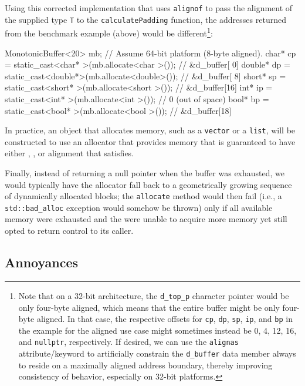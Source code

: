 \noindent Using this corrected implementation that uses \lstinline!alignof! to pass
the alignment of the supplied type \lstinline!T! to the
\lstinline!calculatePadding! function, the addresses returned from the
benchmark example (above) would be different{\cprotect\footnote{Note
that on a 32-bit architecture, the \lstinline!d_top_p! character
pointer would be only four-byte aligned, which means that the entire
buffer might be only four-byte aligned. In that case, the respective
offsets for \lstinline!cp!, \lstinline!dp!, \lstinline!sp!, \lstinline!ip!, and
\lstinline!bp! in the example for the aligned use case might sometimes
instead be 0, 4, 12, 16, and \lstinline!nullptr!, respectively. If
  desired, we can use the \lstinline!alignas!
  attribute/keyword to artificially constrain the \lstinline!d_buffer!
  data member always to reside on a maximally aligned address boundary,
  thereby improving consistency of behavior, especially on 32-bit
  platforms.}}:

\begin{emcppslisting}
MonotonicBuffer<20> mb;  // Assume 64-bit platform (8-byte aligned).
char*   cp = static_cast<char*  >(mb.allocate<char  >());  // &d_buffer[ 0]
double* dp = static_cast<double*>(mb.allocate<double>());  // &d_buffer[ 8]
short*  sp = static_cast<short* >(mb.allocate<short >());  // &d_buffer[16]
int*    ip = static_cast<int*   >(mb.allocate<int   >());  // 0 (out of space)
bool*   bp = static_cast<bool*  >(mb.allocate<bool  >());  // &d_buffer[18]
\end{emcppslisting}
    
\noindent In practice, an object that allocates memory, such as a \lstinline!vector!
or a \lstinline!list!, will be constructed to use an allocator that provides memory that is guaranteed to have either , , or alignment that satisfies.

Finally, instead of returning a null pointer when the buffer was
exhausted, we would typically have the allocator fall back to a
geometrically growing sequence of dynamically allocated blocks; the
\lstinline!allocate! method would then fail (i.e., a
\lstinline!std::bad_alloc! exception would somehow be thrown) only if all
available memory were exhausted and the 
were unable to acquire more memory yet still opted to return control
to its caller.

\subsection[Annoyances]{Annoyances}\label{annoyances-alignof}

